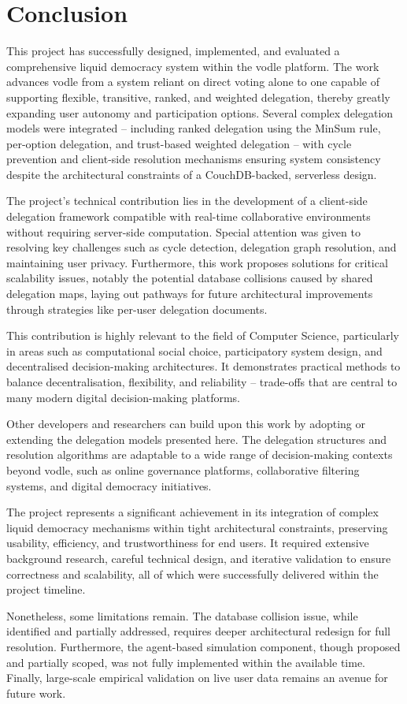 \chapter{Conclusion}\label{ch:conclusions}

This project has successfully designed, implemented, and evaluated a comprehensive liquid democracy system within the vodle platform. The work advances vodle from a system reliant on direct voting alone to one capable of supporting flexible, transitive, ranked, and weighted delegation, thereby greatly expanding user autonomy and participation options. Several complex delegation models were integrated -- including ranked delegation using the MinSum rule, per-option delegation, and trust-based weighted delegation -- with cycle prevention and client-side resolution mechanisms ensuring system consistency despite the architectural constraints of a CouchDB-backed, serverless design.

The project's technical contribution lies in the development of a client-side delegation framework compatible with real-time collaborative environments without requiring server-side computation. Special attention was given to resolving key challenges such as cycle detection, delegation graph resolution, and maintaining user privacy. Furthermore, this work proposes solutions for critical scalability issues, notably the potential database collisions caused by shared delegation maps, laying out pathways for future architectural improvements through strategies like per-user delegation documents.

This contribution is highly relevant to the field of Computer Science, particularly in areas such as computational social choice, participatory system design, and decentralised decision-making architectures. It demonstrates practical methods to balance decentralisation, flexibility, and reliability -- trade-offs that are central to many modern digital decision-making platforms.

Other developers and researchers can build upon this work by adopting or extending the delegation models presented here. The delegation structures and resolution algorithms are adaptable to a wide range of decision-making contexts beyond vodle, such as online governance platforms, collaborative filtering systems, and digital democracy initiatives.

The project represents a significant achievement in its integration of complex liquid democracy mechanisms within tight architectural constraints, preserving usability, efficiency, and trustworthiness for end users. It required extensive background research, careful technical design, and iterative validation to ensure correctness and scalability, all of which were successfully delivered within the project timeline.

Nonetheless, some limitations remain. The database collision issue, while identified and partially addressed, requires deeper architectural redesign for full resolution. Furthermore, the agent-based simulation component, though proposed and partially scoped, was not fully implemented within the available time. Finally, large-scale empirical validation on live user data remains an avenue for future work.